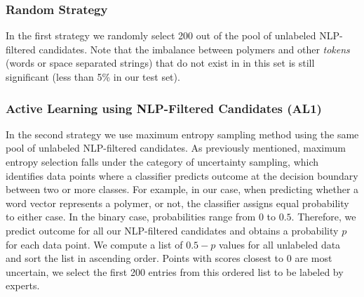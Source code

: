 \subsubsection{Random Strategy}
In the first strategy we randomly select 200 out of the pool of unlabeled NLP-filtered candidates.
Note that the imbalance between polymers and other \textit{tokens} (words or space separated strings) that 
do not exist in in this set is still significant (less than 5\% in our test set).

\subsubsection{Active Learning using NLP-Filtered Candidates (AL1)}
In the second strategy we use maximum entropy sampling method using the same pool of unlabeled NLP-filtered candidates.
As previously mentioned, maximum entropy selection falls under the category of uncertainty sampling, which identifies data points where a classifier predicts outcome at the decision boundary between two or more classes. 
For example, in our case, when predicting whether a word vector represents a polymer, or not, the classifier assigns equal probability to either case.
In the binary case, probabilities range from $0$ to $0.5$. Therefore, we predict outcome for all our NLP-filtered candidates and obtains a probability $p$ for each data point. We compute a list of $0.5-p$ values for all unlabeled data and sort the list in ascending order.
Points with scores closest to $0$ are most uncertain, we select the first 200 entries from this ordered list to be labeled by experts.

